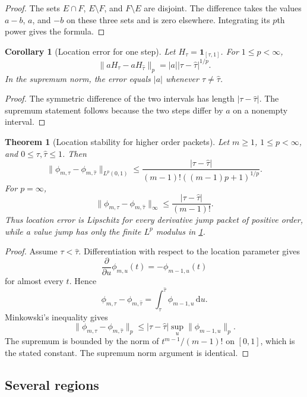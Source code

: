 \documentclass{aomart}
\newtheorem{theorem}{Theorem}[section]
\newtheorem{corollary}[corollary]{Corollary}
\theoremstyle{definition}
\theoremstyle{remark}
\newcommand{\one}{\mathbf 1}
\newcommand{\dd}{\,\mathrm d}
\begin{document}
\begin{proof}
The sets \(E\cap F\), \(E\setminus F\), and \(F\setminus E\) are disjoint. The difference takes the values \(a-b\), \(a\), and \(-b\) on these three sets and is zero elsewhere. Integrating its \(p\)th power gives the formula.
\end{proof}

\begin{corollary}[Location error for one step]\label{cor:step_location_error}
Let \(H_\tau=\one_{[\tau,1]}\). For \(1\leq p<\infty\),
\[
\|aH_\tau-aH_{\widehat\tau}\|_p
=
|a||\tau-\widehat\tau|^{1/p}.
\]
In the supremum norm, the error equals \(|a|\) whenever \(\tau\neq\widehat\tau\).
\end{corollary}

\begin{proof}
The symmetric difference of the two intervals has length \(|\tau-\widehat\tau|\). The supremum statement follows because the two steps differ by \(a\) on a nonempty interval.
\end{proof}

\begin{theorem}[Location stability for higher order packets]\label{thm:higher_order_location}
Let \(m\geq1\), \(1\leq p<\infty\), and \(0\leq\tau,\widehat\tau\leq1\). Then
\[
\|\phi_{m,\tau}-\phi_{m,\widehat\tau}\|_{L^p(0,1)}
\leq
\frac{|\tau-\widehat\tau|}
{(m-1)!((m-1)p+1)^{1/p}}.
\]
For \(p=\infty\),
\[
\|\phi_{m,\tau}-\phi_{m,\widehat\tau}\|_\infty
\leq
\frac{|\tau-\widehat\tau|}{(m-1)!}.
\]
Thus location error is Lipschitz for every derivative jump packet of positive order, while a value jump has only the finite \(L^p\) modulus in \cref{cor:step_location_error}.
\end{theorem}

\begin{proof}
Assume \(\tau<\widehat\tau\). Differentiation with respect to the location parameter gives
\[
\frac{\partial}{\partial u}\phi_{m,u}(t)
=-\phi_{m-1,u}(t)
\]
for almost every \(t\). Hence
\[
\phi_{m,\tau}-\phi_{m,\widehat\tau}
=
\int_\tau^{\widehat\tau}\phi_{m-1,u}\dd u.
\]
Minkowski's inequality gives
\[
\|\phi_{m,\tau}-\phi_{m,\widehat\tau}\|_p
\leq
|\tau-\widehat\tau|
\sup_u\|\phi_{m-1,u}\|_p.
\]
The supremum is bounded by the norm of \(t^{m-1}/(m-1)!\) on \([0,1]\), which is the stated constant. The supremum norm argument is identical.
\end{proof}

\subsection{Several regions}
\end{document}
